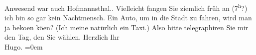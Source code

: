 \begin{ledgroupsized}[t]{13cm}
{{{                     Anwesend war auch Hofmannsthal.}}}\label{K_L02457_1h}. Vielleicht
                  {\pb}fangen Sie ziemlich früh an
                     (7\textsuperscript{h}?) ich bin so gar kein Nachtmensch.\pend
           \pstart
           Ein Auto, um in die Stadt zu fahren, wird man ja beko{\geminationm}en
                  kö{\geminationn}en? (Ich meine natürlich ein Taxi.)\pend
           \pstart
           Also bitte telegraphiren Sie mir den Tag, den Sie wählen.\pend
           \pstart
           Herzlich Ihr{\\[\baselineskip]}\spacefill\mbox{Hugo.}\pend
           \leftskip=0em{}
         
         \endnumbering{}\end{ledgroupsized}  \newcommand{\dateiname}{L02457}\newcommand{\titel}{Hugo Hofmannsthal an Arthur Schnitzler, 10. 12. 1925}\newcommand{\editorInnen}{Martin Anton Müller und Gerd-Hermann Susen}
      